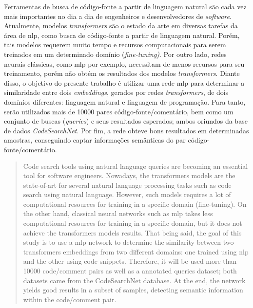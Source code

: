 \begin{resumo}
Ferramentas de busca de código-fonte a partir de linguagem natural são cada vez mais importantes no dia a dia de engenheiros e desenvolvedores de \textit{software}. Atualmente, modelos \textit{transformers} são o estado da arte em diversas tarefas da área de \gls{nlp}, como busca de código-fonte a partir de linguagem natural. Porém, tais modelos requerem muito tempo e recursos computacionais para serem treinados em um determinado domínio (\textit{fine-tuning)}. Por outro lado, redes neurais clássicas, como \gls{mlp} por exemplo, necessitam de menos recursos para seu treinamento, porém não obtém os resultados dos modelos \textit{transformers}. Diante disso, o objetivo do presente trabalho é utilizar uma rede \gls{mlp} para determinar a similaridade entre dois \textit{embeddings}, gerados por redes \textit{transformers}, de dois domínios diferentes: linguagem natural e linguagem de programação. Para tanto, serão utilizados mais de 10000 pares código-fonte/comentário, bem como um conjunto de buscas (\textit{queries}) e seus resultados esperados; ambos oriundos da base de dados \textit{CodeSearchNet}. Por fim, a rede obteve bons resultados em determinadas amostras, conseguindo captar informações semânticas do par código-fonte/comentário.

\end{resumo}

\begin{abstract}
Code search tools using natural language queries are becoming an essential tool for software engineers. Nowadays, the transformers models are the state-of-art for several natural language processing tasks such as code search using natural language. However, such models requires a lot of computational resources for training in a specific domain (fine-tuning). On the other hand, classical neural networks such as \gls{mlp} takes less computational resources for training in a specific domain, but it does not achieve the transformers models results. That being said, the goal of this study is to use a \gls{mlp} network to determine the similarity between two transformers embeddings from two different domains: one trained using \gls{nlp} and the other using code snippets. Therefore, it will be used more than 10000 code/comment pairs as well as a annotated queries dataset; both datasets came from the CodeSearchNet database. At the end, the network yields good results in a subset of samples, detecting semantic information within the code/comment pair.

\end{abstract}
